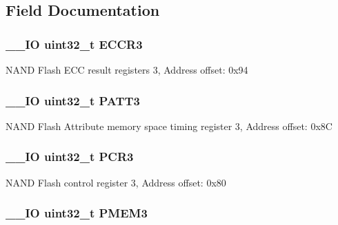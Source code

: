 \subsection{Field Documentation}
\hypertarget{struct_f_s_m_c___bank3___type_def_a6062be7dc144c07e01c303cb49d69ce2}{
\subsubsection[{E\-C\-C\-R3}]{\setlength{\rightskip}{0pt plus 5cm}\-\_\-\-\_\-\-I\-O uint32\-\_\-t E\-C\-C\-R3}}\label{struct_f_s_m_c___bank3___type_def_a6062be7dc144c07e01c303cb49d69ce2}
N\-A\-N\-D Flash E\-C\-C result registers 3, Address offset\-: 0x94 \hypertarget{struct_f_s_m_c___bank3___type_def_aba03fea9c1bb2242d963e29f1b94d25e}{
\subsubsection[{P\-A\-T\-T3}]{\setlength{\rightskip}{0pt plus 5cm}\-\_\-\-\_\-\-I\-O uint32\-\_\-t P\-A\-T\-T3}}\label{struct_f_s_m_c___bank3___type_def_aba03fea9c1bb2242d963e29f1b94d25e}
N\-A\-N\-D Flash Attribute memory space timing register 3, Address offset\-: 0x8\-C \hypertarget{struct_f_s_m_c___bank3___type_def_a73861fa74b83973fa1b5f92735c042ef}{
\subsubsection[{P\-C\-R3}]{\setlength{\rightskip}{0pt plus 5cm}\-\_\-\-\_\-\-I\-O uint32\-\_\-t P\-C\-R3}}\label{struct_f_s_m_c___bank3___type_def_a73861fa74b83973fa1b5f92735c042ef}
N\-A\-N\-D Flash control register 3, Address offset\-: 0x80 \hypertarget{struct_f_s_m_c___bank3___type_def_aba8981e4f06cfb3db7d9959242052f80}{
\subsubsection[{P\-M\-E\-M3}]{\setlength{\rightskip}{0pt plus 5cm}\-\_\-\-\_\-\-I\-O uint32\-\_\-t P\-M\-E\-M3}}\label{struct_f_s_m_c___bank3___type_def_aba8981e4f06cfb3db7d9959242052f80}
